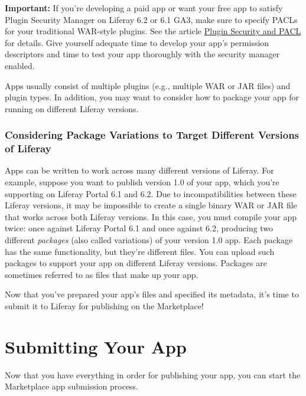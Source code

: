 \noindent\hrulefill

\textbf{Important:} If you're developing a paid app or want your free
app to satisfy Plugin Security Manager on Liferay 6.2 or 6.1 GA3, make
sure to specify PACLs for your traditional WAR-style plugins. See the
article
\href{/docs/6-2/tutorials/-/knowledge_base/t/plugin-security-and-pacl}{Plugin
Security and PACL} for details. Give yourself adequate time to develop
your app's permission descriptors and time to test your app thoroughly
with the security manager enabled.

\noindent\hrulefill

Apps usually consist of multiple plugins (e.g., multiple WAR or JAR
files) and plugin types. In addition, you may want to consider how to
package your app for running on different Liferay versions.

\subsection{Considering Package Variations to Target Different Versions
of
Liferay}\label{considering-package-variations-to-target-different-versions-of-liferay}

Apps can be written to work across many different versions of Liferay.
For example, suppose you want to publish version 1.0 of your app, which
you're supporting on Liferay Portal 6.1 and 6.2. Due to
incompatibilities between these Liferay versions, it may be impossible
to create a single binary WAR or JAR file that works across both Liferay
versions. In this case, you must compile your app twice: once against
Liferay Portal 6.1 and once against 6.2, producing two different
\emph{packages} (also called variations) of your version 1.0 app. Each
package has the same functionality, but they're different files. You can
upload such packages to support your app on different Liferay versions.
Packages are sometimes referred to as files that make up your app.

Now that you've prepared your app's files and specified its metadata,
it's time to submit it to Liferay for publishing on the Marketplace!

\chapter{Submitting Your App}\label{submitting-your-app}

Now that you have everything in order for publishing your app, you can
start the Marketplace app submission process.

